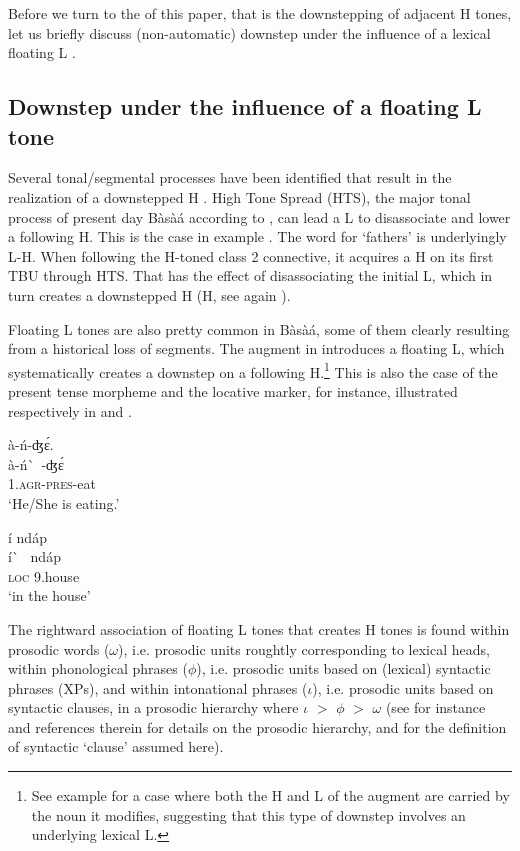 \documentclass[output=paper,newtxmath,modfonts,nonflat]{langsci/langscibook}
\begin{document}
\noindent Before we turn to the  of this paper, that is the downstepping of adjacent H tones, let us briefly discuss (non-automatic) downstep under the influence of a lexical floating L .

\subsection{Downstep under the influence of a floating L tone}

Several tonal/segmental processes have been identified that result in the realization of a downstepped H . High Tone Spread (HTS), the major tonal process of present day Bàsà{á} according to \citet{Hyman03}, can lead a L  to disassociate and lower a following H. This is the case in example . The word for `fathers' is underlyingly L-H. When following the H-toned class 2 connective, it acquires a H on its first TBU through HTS. That has the effect of disassociating the initial L, which in turn creates a downstepped H ({\textdownstep}H, see again ).


Floating L tones are also pretty common in Bàsà{á}, some of them clearly resulting from a historical loss of segments. The augment in  introduces a floating L, which systematically creates a downstep on a following H.\footnote{See example  for a case where both the H and L  of the augment are carried by the noun it modifies, suggesting that this type of downstep involves an underlying lexical L.}  This is also the case of the present tense morpheme and the locative marker, for instance, illustrated respectively in  and .


\ea à-ń-{\textdownstep}ʤ\'ɛ. \label{ex:HamlaouiMakasso:3}\\
\gll à-ń\`~-ʤ\'ɛ\\ 
1.\textsc{agr}-\textsc{pres}-eat\\
\glt `He/She is eating.'
\z


\ea í {\textdownstep}nd{á}p \label{ex:HamlaouiMakasso:4} \\
 \gll í\`~ nd{á}p\\
\textsc{loc} 9.house\\
\glt `in the house'
\z

\noindent
The rightward association of floating L tones that creates {\textdownstep}H tones is found within prosodic words ($\omega$), i.e. prosodic units roughtly corresponding to lexical heads, within phonological phrases ($\phi$), i.e. prosodic units based on (lexical) syntactic phrases (XPs), and within intonational phrases ($\iota$), i.e. prosodic units based on syntactic clauses, in a prosodic hierarchy where $\iota$ $>$ $\phi$ $>$ $\omega$ (see for instance \citet{Selkirk11} and references therein for details on the prosodic hierarchy, and \citet{HamlaouiSzendroi15, HamlaouiSzendroi16} for the definition of syntactic `clause' assumed here).
\end{document}
